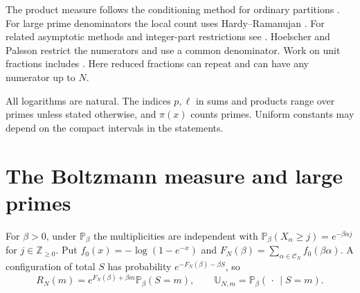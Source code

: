 \documentclass[11pt]{amsart}
\theoremstyle{remark}
\newcommand{\Pp}{\mathbb P}
\newcommand{\Z}{\mathbb Z}
\newcommand{\CN}{\mathcal C_N}
\begin{document}
The product measure follows the conditioning method for ordinary
partitions \cite{fristedt,erdos-lehner,granovsky-stark-erlihson,vershik,duchon-et-al}.
For large prime denominators the local count uses Hardy--Ramanujan
\cite{hardy-ramanujan}. For related asymptotic methods and integer-part
restrictions see \cite{ingham-tauberian,meinardus,roth-szekeres,vaughan}.
Hoelscher and Palsson \cite{hoelscher-palsson} restrict the numerators
and use a common denominator. Work on unit fractions includes
\cite{croot,bloom,bloom-elsholtz,conlon-et-al,liu-sawhney,bettin-et-al}.
Here reduced fractions can repeat and can have any numerator up to \(N\).

All logarithms are natural. The indices \(p,\ell\) in sums and products
range over primes unless stated otherwise, and \(\pi(x)\) counts primes.
Uniform constants may depend on the compact intervals in the statements.

\section{The Boltzmann measure and large primes}\label{sec:boltzmann}

For \(\beta>0\), under \(\mathbb P_\beta\) the multiplicities are independent with
\(\Pp_\beta(X_\alpha\ge j)=e^{-\beta\alpha j}\) for \(j\in\Z_{\ge0}\).
Put \(f_0(x)=-\log(1-e^{-x})\) and
\(F_N(\beta)=\sum_{\alpha\in\CN}f_0(\beta\alpha)\). A configuration of
total \(S\) has probability \(e^{-F_N(\beta)-\beta S}\), so
\begin{equation}\label{eq:boltzmann}
 R_N(m)=e^{F_N(\beta)+\beta m}\Pp_\beta(S=m),\qquad
 \mathbb U_{N,m}=\Pp_\beta(\,\cdot\,\mid S=m).
\end{equation}
\end{document}
